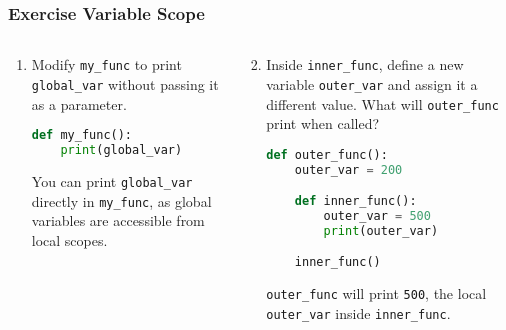 \begin{frame}[fragile]
  \frametitle{Exercise Variable Scope}
  \begin{columns}[T]

    \begin{column}{0.5\textwidth}
      \begin{enumerate}
        \item Modify \texttt{my\_func} to print \texttt{global\_var} without passing it as a parameter.\pause
        \begin{lstlisting}[language=Python, basicstyle=\scriptsize]
def my_func():
    print(global_var)
        \end{lstlisting}
        You can print \texttt{global\_var} directly in \texttt{my\_func}, as global variables are accessible from local scopes.
      \end{enumerate}
    \end{column}

    \begin{column}{0.5\textwidth}
      \begin{enumerate}
        \setcounter{enumi}{1}
        \item Inside \texttt{inner\_func}, define a new variable \texttt{outer\_var} and assign it a different value. What will \texttt{outer\_func} print when called? \pause
        \begin{lstlisting}[language=Python, basicstyle=\scriptsize]
def outer_func():
    outer_var = 200

    def inner_func():
        outer_var = 500
        print(outer_var)

    inner_func()
        \end{lstlisting}
        \texttt{outer\_func} will print \texttt{500}, the local \texttt{outer\_var} inside \texttt{inner\_func}.
      \end{enumerate}
    \end{column}

  \end{columns}
\end{frame}



